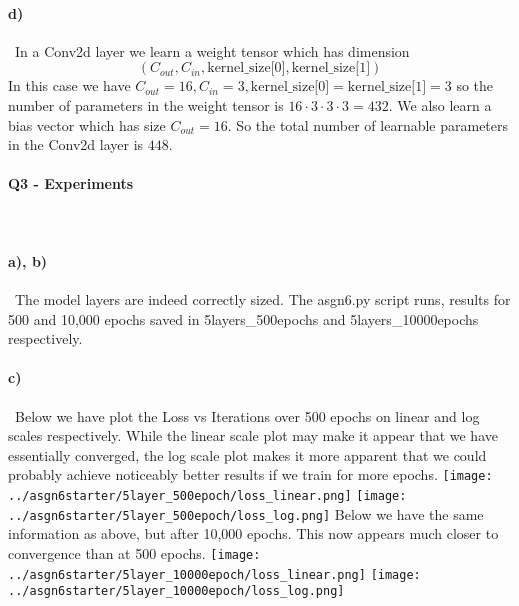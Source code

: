 \documentclass[a4paper,12pt]{article}
\begin{document}
\paragraph{d)}
\
In a Conv2d layer we learn a weight tensor which has dimension $$(C_{out}, C_{in}, \text{kernel\_size[0]},\text{kernel\_size[1]})$$
In this case we have $C_{out} = 16, C_{in} = 3, \text{kernel\_size[0]}=\text{kernel\_size[1]}=3$ so the number of parameters in the weight tensor is $ 16 \cdot 3 \cdot 3 \cdot 3 = 432.$ We also learn a bias vector which has size $C_{out} = 16.$ So the total number of learnable parameters in the Conv2d layer is $448.$ 
\paragraph{Q3 - Experiments}
\
\newline

\paragraph{a), b)}
\
The model layers are indeed correctly sized. The asgn6.py script runs, results for 500 and 10,000 epochs saved in 5layers\_500epochs and 5layers\_10000epochs respectively. 
\paragraph{c)}
\
Below we have plot the Loss vs Iterations over 500 epochs on linear and log scales respectively. While the linear scale plot may make it appear that we have essentially converged, the log scale plot makes it more apparent that we could probably achieve noticeably better results if we train for more epochs.
\newline
\texttt{[image: ../asgn6starter/5layer\_500epoch/loss\_linear.png]}
\texttt{[image: ../asgn6starter/5layer\_500epoch/loss\_log.png]}
\newline
Below we have the same information as above, but after 10,000 epochs. This now appears much closer to convergence than at 500 epochs.
\newline
\texttt{[image: ../asgn6starter/5layer\_10000epoch/loss\_linear.png]}
\texttt{[image: ../asgn6starter/5layer\_10000epoch/loss\_log.png]}
\end{document}
